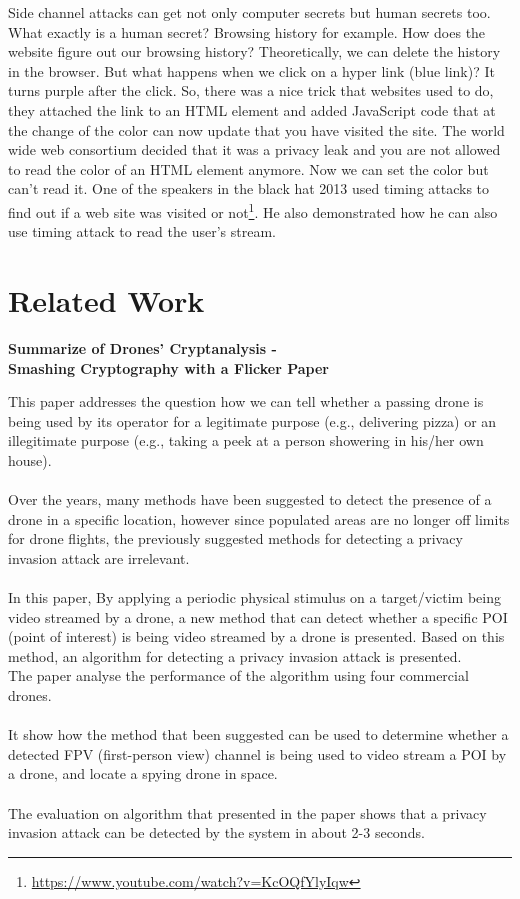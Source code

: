 Side channel attacks can get not only computer secrets but human secrets too.
What exactly is a human secret? Browsing history for example. How does the
website figure out our browsing history? Theoretically, we can delete the
history in the browser. But what happens when we click on a hyper link (blue
link)? It turns purple after the click. So, there was a nice trick that websites
used to do, they attached the link to an HTML element and added JavaScript code
that at the change of the color can now update that you have visited the site.
The world wide web consortium decided that it was a privacy leak and you are not
allowed to read the color of an HTML element anymore. Now we can set the color
but can't read it. One of the speakers in the black hat 2013 used timing attacks
to find out if a web site was visited or
not\footnote{\url{https://www.youtube.com/watch?v=KcOQfYlyIqw}}. He also
demonstrated how he can also use timing attack to read the user's stream.

\section{Related Work} \label{sec:RelatedWork}

\textbf{Summarize of Drones’ Cryptanalysis -} 
\\ \textbf{Smashing Cryptography with a Flicker Paper}

This paper \cite{nassi2019drones} addresses the question how we can tell whether a passing drone is being used by its operator for a legitimate purpose (e.g., delivering pizza) or an illegitimate purpose (e.g., taking a peek at a person showering in his/her own house).\\
\\Over the years, many methods have been suggested to detect the presence of a drone in a specific location, however since populated areas are no longer off limits for drone flights, the previously suggested methods for detecting a privacy invasion attack are irrelevant.\\ 
\\In this paper, By applying a periodic physical stimulus on a target/victim being video streamed by a drone,  a new method that can detect whether a specific POI (point of interest) is being video streamed by a drone is presented. 
Based on this method, an algorithm for detecting a privacy invasion attack is presented.\\ 
The paper analyse the performance of the algorithm using four commercial drones. \\
\\It show how the method that been suggested can be used to determine whether a detected FPV (first-person view) channel is being used to video stream a POI by a drone, and locate a spying drone in space.\\
\\The evaluation on algorithm that presented in the paper shows that a privacy invasion attack can be detected by the system in about 2-3 seconds.

